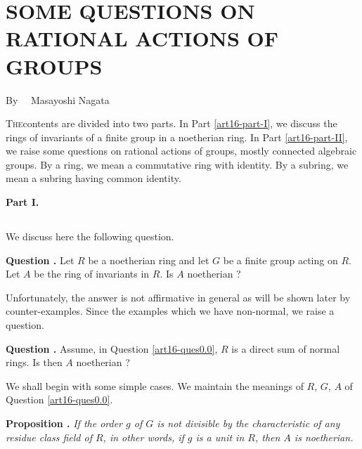 \chapter[\textsc{M. Nagata~:} Some Questions on Rational Actions of Groups]{SOME QUESTIONS ON RATIONAL ACTIONS OF GROUPS}\label{art16}

\begin{center}
By~~ Masayoshi Nagata
\end{center}


\setcounter{pageoriginal}{322}
\textsc{The}\pageoriginale contents are divided into two parts. In Part \ref{art16-part-I}, we discuss the rings of invariants of a finite group in a noetherian ring. In Part \ref{art16-part-II}, we raise some questions on rational actions of groups, mostly connected algebraic groups. By a ring, we mean a commutative ring with identity. By a subring, we mean a subring having common identity.

\bigskip
\begin{center}
{\bf\Large Part I.}
\end{center}

\setcounter{section}{-1}
\section{} We discuss here the following question.

\noindent
{\bf Question .\label{art16-ques0.0}}
Let $R$ be a noetherian ring and let $G$ be a finite group acting on $R$. Let $A$ be the ring of invariants in $R$. Is $A$ noetherian ?


Unfortunately, the answer is not affirmative in general as will be shown later by counter-examples. Since the examples which we have non-normal, we raise a question.

\medskip
\noindent
{\bf Question .\label{art16-ques0.1}}
Assume, in Question \ref{art16-ques0.0}, $R$ is a direct sum of normal rings. Is then $A$ noetherian ?
\smallskip

We shall begin with some simple cases. We maintain the meanings of $R$, $G$, $A$ of Question \ref{art16-ques0.0}.

\medskip
\noindent
{\bf Proposition .\label{art16-prop0.2}}
{\em If the order $g$ of $G$ is not divisible by the characteristic of any residue class field of $R$, in other words, if $g$ is a unit in $R$, then $A$ is noetherian.}


